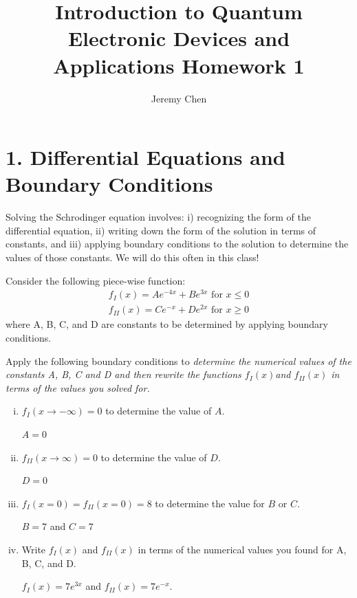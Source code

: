 \documentclass[10pt,letterpaper]{article}
\title{Introduction to Quantum Electronic Devices and Applications Homework 1}
\author{Jeremy Chen}
\begin{document}
	\maketitle
	
\section*{1. Differential Equations and Boundary Conditions}
Solving the Schrodinger equation involves: i) recognizing the form of the differential equation, ii) writing down the form of the solution in terms of constants, and iii) applying boundary conditions to the solution to determine the values of those constants. We will do this often in this class!

\noindent Consider the following piece-wise function:
\begin{gather*}
f_{I}(x) = Ae^{-4x} + Be^{3x}  \text{ for } x \leq 0 \\
f_{II}(x) = Ce^{-x} + De^{2x} \text{ for } x \geq 0
\end{gather*}
where A, B, C, and D are constants to be determined by applying boundary conditions. 

\noindent Apply the following boundary conditions to \textit{determine the numerical values of the constants A, B, C and D and then rewrite the functions $f_{I}(x)$and $f_{II}(x)$ in terms of the values you solved for.}

\begin{enumerate}[i)]
\item $f_{I}(x \rightarrow -\infty) = 0$ to determine the value of $A$. 

\color{violet}
$A = 0$
\color{black}

\item $f_{II}(x \rightarrow \infty) = 0$ to determine the value of $D$. 

\color{violet}
$D = 0$
\color{black}

\item $f_{I}(x = 0) = f_{II}(x = 0) = 8$ to determine the value for $B$ or $C$. 

\color{violet}
$B = 7$ and $C = 7$
\color{black}

\item Write $f_{I}(x)$ and $f_{II}(x)$ in terms of the numerical values you found for A, B, C, and D. 

\color{violet}
$f_{I}(x) = 7e^{3x}$ and $f_{II}(x) = 7e^{-x}$. 
\color{black}
\end{enumerate}
\end{document}
